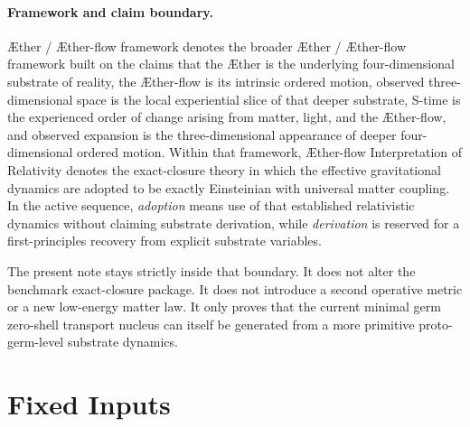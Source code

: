 \documentclass[11pt]{article}
\newcommand{\Aether}{\AE{}ther}
\newcommand{\Aflow}{\AE{}ther-flow}
\newcommand{\TheoryName}{\Aflow{} Interpretation of Relativity}
\newcommand{\TheoryProgram}{\Aether{} / \Aflow{} framework}
\begin{document}
\paragraph{Framework and claim boundary.}
\TheoryProgram{} denotes the broader \Aether{} / \Aflow{} framework built on the claims that the \Aether{} is the underlying four-dimensional substrate of reality, the \Aflow{} is its intrinsic ordered motion, observed three-dimensional space is the local experiential slice of that deeper substrate, S-time is the experienced order of change arising from matter, light, and the \Aflow{}, and observed expansion is the three-dimensional appearance of deeper four-dimensional ordered motion. Within that framework, \TheoryName{} denotes the exact-closure theory in which the effective gravitational dynamics are adopted to be exactly Einsteinian with universal matter coupling. In the active sequence, \emph{adoption} means use of that established relativistic dynamics without claiming substrate derivation, while \emph{derivation} is reserved for a first-principles recovery from explicit substrate variables.

The present note stays strictly inside that boundary. It does not alter the benchmark exact-closure package. It does not introduce a second operative metric or a new low-energy matter law. It only proves that the current minimal germ zero-shell transport nucleus can itself be generated from a more primitive proto-germ-level substrate dynamics.

\section{Fixed Inputs}
\end{document}
